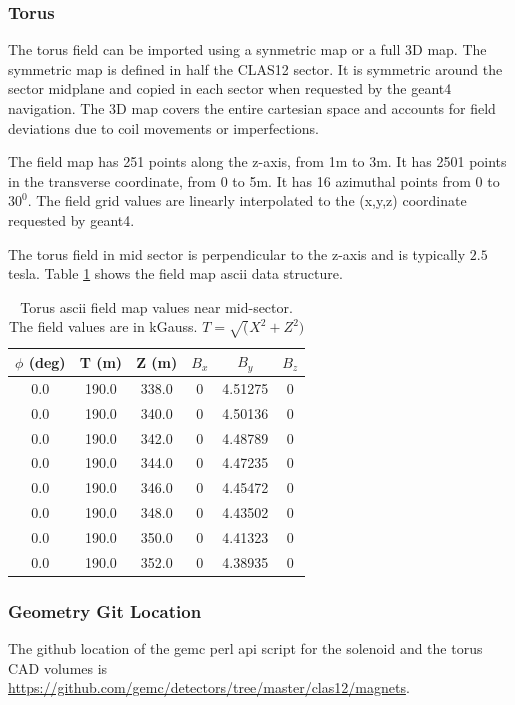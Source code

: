 \subsubsection{Torus}
The torus field can be imported using a synmetric map or a full 3D map.
The symmetric map is defined in half the CLAS12 sector. It is symmetric around the sector midplane and copied in each sector
when requested by the geant4 navigation. The 3D map covers the entire cartesian space and accounts for field deviations due to coil
movements or imperfections.


The field map has 251 points along the z-axis, from 1m to 3m. It has 2501 points in the transverse coordinate, from 0 to 5m.
It has 16 azimuthal points from $0$ to $30^0$. The field grid values are linearly interpolated to the (x,y,z) coordinate requested by geant4.

The torus field in mid sector is perpendicular to the z-axis and is typically $2.5$ tesla.
Table \ref{tab:torMap} shows the field map ascii data structure.

\begin{table}[h]
	\begin{center}
		\begin{tabular}{| c | c | c | c | c | c | }
         $\phi$ (deg) & T (m)    & Z (m)    &  $B_x $  &    $B_y$    & $B_z$\\
			\hline
          0.0         &  190.0   &  338.0   &  0       &     4.51275 &  0 \\
          0.0         &  190.0   &  340.0   &  0       &     4.50136 &  0 \\
          0.0         &  190.0   &  342.0   &  0       &     4.48789 &  0 \\
          0.0         &  190.0   &  344.0   &  0       &     4.47235 &  0 \\
          0.0         &  190.0   &  346.0   &  0       &     4.45472 &  0 \\
          0.0         &  190.0   &  348.0   &  0       &     4.43502 &  0 \\
          0.0         &  190.0   &  350.0   &  0       &     4.41323 &  0 \\
          0.0         &  190.0   &  352.0   &  0       &     4.38935 &  0 \\
		\end{tabular}
	\end{center}
	\caption{Torus ascii field map values near mid-sector. The field values are in kGauss. $T=\sqrt(X^2+Z^2)$}\label{tab:torMap}
\end{table}


\subsubsection{Geometry Git Location}
The github location of the gemc perl api script for the solenoid and the torus CAD volumes is \url{https://github.com/gemc/detectors/tree/master/clas12/magnets}.

